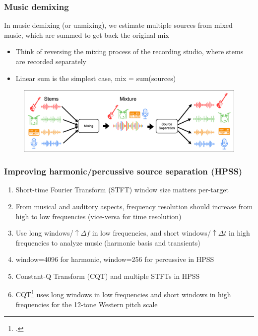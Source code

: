 \documentclass[usenames,dvipsnames]{beamer}
\begin{document}
\begin{frame}
	\frametitle{Music demixing}
	In music demixing (or unmixing), we estimate multiple sources from mixed music, which are summed to get back the original mix
	\begin{itemize}
		\item
			Think of reversing the mixing process of the recording studio, where stems are recorded separately
		\item
			Linear sum is the simplest case, mix = sum(sources)
	\end{itemize}
	\begin{figure}[ht]
		\centering
		\vspace{-0.5em}
		\includegraphics[width=\textwidth]{./images-mss/mixdemix.png}
	\end{figure}
\end{frame}


\begin{frame}
	\frametitle{Improving harmonic/percussive source separation (HPSS)}
	\begin{enumerate}
	\item
		Short-time Fourier Transform (STFT) window size matters per-target
	\item
		From musical and auditory aspects, frequency resolution should increase from high to low frequencies (vice-versa for time resolution)
	\item
		Use long windows/$\uparrow \Delta f$ in low frequencies, and short windows/$\uparrow \Delta t$ in high frequencies to analyze music (harmonic basis and transients)
	\item
		window=4096 for harmonic, window=256 for percussive in HPSS
	\item
		Constant-Q Transform (CQT) and multiple STFTs in HPSS
	\item
		CQT\footcite{jbrown, klapuricqt} uses long windows in low frequencies and short windows in high frequencies for the 12-tone Western pitch scale
	\end{enumerate}
\end{frame}
\end{document}
